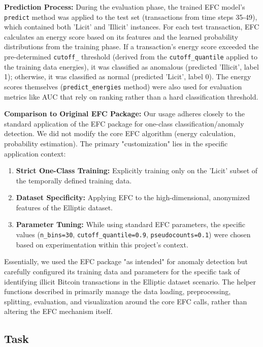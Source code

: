 \documentclass[12pt]{article}
\begin{document}
\textbf{Prediction Process:} During the evaluation phase, the trained EFC model's \texttt{predict} method was applied to
the test set (transactions from time steps 35-49), which contained both 'Licit' and 'Illicit' instances. For each test
transaction, EFC calculates an energy score based on its features and the learned probability distributions from the
training phase. If a transaction's energy score exceeded the pre-determined \texttt{cutoff\_} threshold (derived from
the \texttt{cutoff\_quantile} applied to the training data energies), it was classified as anomalous (predicted 'Illicit',
label 1); otherwise, it was classified as normal (predicted 'Licit', label 0). The energy scores themselves
(\texttt{predict\_energies} method) were also used for evaluation metrics like AUC that rely on ranking rather than a
hard classification threshold.

\textbf{Comparison to Original EFC Package:} Our usage adheres closely to the standard application of the EFC package for
one-class classification/anomaly detection. We did not modify the core EFC algorithm (energy calculation, probability
estimation). The primary "customization" lies in the specific application context:

\begin{enumerate}
    \item \textbf{Strict One-Class Training:} Explicitly training only on the 'Licit' subset of the temporally defined training data.
    \item \textbf{Dataset Specificity:} Applying EFC to the high-dimensional, anonymized features of the Elliptic dataset.
    \item \textbf{Parameter Tuning:} While using standard EFC parameters, the specific values (\texttt{n\_bins=30},
    \texttt{cutoff\_quantile=0.9}, \texttt{pseudocounts=0.1}) were chosen based on experimentation within this project's
    context.
\end{enumerate}

Essentially, we used the EFC package "as intended" for anomaly detection but carefully configured its training data and
parameters for the specific task of identifying illicit Bitcoin transactions in the Elliptic dataset scenario. The helper
functions described in \cite{reproducibility} primarily manage the data loading, preprocessing, splitting, evaluation, and visualization
around the core EFC calls, rather than altering the EFC mechanism itself.


\subsection{Task} \label{subsec:task}
\end{document}
